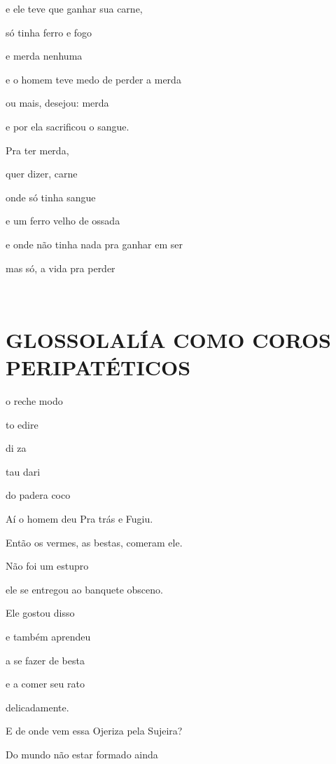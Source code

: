 e ele teve que ganhar sua carne,

só tinha ferro e fogo

e merda nenhuma

e o homem teve medo de perder a merda

ou mais, desejou: merda

e por ela sacrificou o sangue.

Pra ter merda, 

quer dizer, carne

onde só tinha sangue

e um ferro velho de ossada

e onde não tinha nada pra ganhar em ser 

mas só, a vida pra perder

~

\section*{GLOSSOLALÍA COMO COROS PERIPATÉTICOS}

o reche modo

to edire

di za

tau dari

do padera coco


Aí o homem deu Pra trás e Fugiu.


Então os vermes, as bestas, comeram ele.


Não foi um estupro \EP[2]

ele se entregou ao banquete obsceno.


Ele gostou disso

e também aprendeu

a se fazer de besta

e a comer seu rato

delicadamente.




E de onde vem essa Ojeriza pela Sujeira?

Do mundo não estar formado ainda


